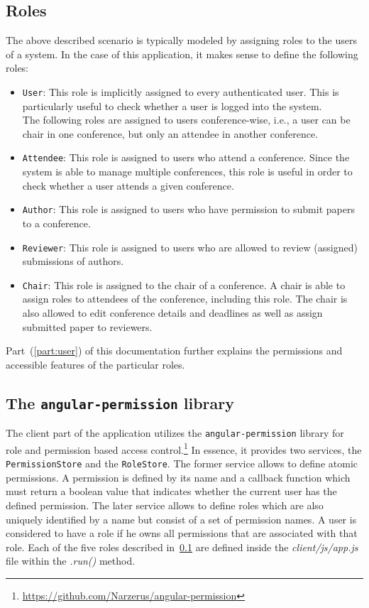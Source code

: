 \documentclass[nochapterpage,nopartpage,noheadingspace,numbersubsubsec,bigchapter,colorback,accentcolor=tud9c,10pt]{tudreport}
\begin{document}
  \subsection{Roles}
  \label{sec:tech:implementation:acl:roles}

    The above described scenario is typically modeled by assigning roles to the users of a system. In the case of this application, it makes sense to define the following roles:
        \begin{itemize}
            \setlength\itemsep{0em}
            \item \texttt{User}: This role is implicitly assigned to every authenticated user. This is particularly useful to check whether a user is logged into the system.\\
            The following roles are assigned to users conference-wise, i.e., a user can be chair in one conference, but only an attendee in another conference.
            \item \texttt{Attendee}: This role is assigned to users who attend a conference. Since the system is able to manage multiple conferences, this role is useful in order to check whether a user attends a given conference.
            \item \texttt{Author}: This role is assigned to users who have permission to submit papers to a conference.
            \item \texttt{Reviewer}: This role is assigned to users who are allowed to review (assigned) submissions of authors.
            \item \texttt{Chair}: This role is assigned to the chair of a conference. A chair is able to assign roles to attendees of the conference, including this role. The chair is also allowed to edit conference details and deadlines as well as assign submitted paper to reviewers.
        \end{itemize}
    Part~(\ref{part:user}) of this documentation further explains the permissions and accessible features of the particular roles.

  \subsection{The \texttt{angular-permission} library}
  \label{sec:tech:implementation:acl:angular-permission}

    The client part of the application utilizes the \texttt{angular-permission} library for role and permission based access control.\footnote{\url{https://github.com/Narzerus/angular-permission}} In essence, it provides two services, the \texttt{PermissionStore} and the \texttt{RoleStore}. The former service allows to define atomic permissions. A permission is defined by its name and a callback function which must return a boolean value that indicates whether the current user has the defined permission. The later service allows to define roles which are also uniquely identified by a name but consist of a set of permission names. A user is considered to have a role if he owns all permissions that are associated with that role. Each of the five roles described in~\ref{sec:tech:implementation:acl:roles} are defined inside the \emph{client/js/app.js} file within the \emph{.run()} method.
\end{document}
